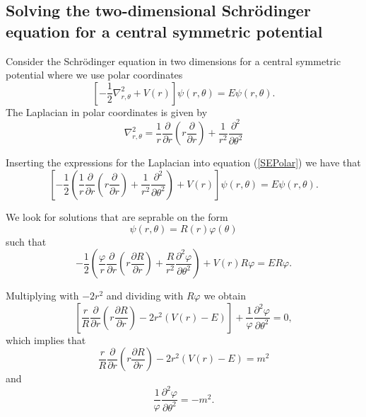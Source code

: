 \documentclass[aip,jcp,reprint,floatfix]{revtex4-1}
\begin{document}
\begin{appendices}
\section{Solving the two-dimensional Schrödinger equation for a central symmetric potential}
Consider the Schrödinger equation in two dimensions for a central symmetric potential where we use polar coordinates 
\begin{equation}
    \left[ - \frac{1}{2} \nabla^2_{r,\theta} + V(r) \right] \psi(r,\theta) = E\psi(r,\theta). \label{SEPolar}
\end{equation}
The Laplacian in polar coordinates is given by
\begin{equation}
    \nabla_{r,\theta}^2 = \frac{1}{r} \frac{\partial}{\partial r} \left( r \frac{\partial}{\partial r} \right) + \frac{1}{r^2} \frac{\partial^2}{\partial \theta^2}
\end{equation}

Inserting the expressions for the Laplacian into equation (\ref{SEPolar}) we have that
\begin{equation}
    \left[ - \frac{1}{2} \left(\frac{1}{r} \frac{\partial}{\partial r} \left( r \frac{\partial}{\partial r} \right) + \frac{1}{r^2} \frac{\partial^2}{\partial \theta^2} \right) + V(r) \right] \psi(r,\theta) = E\psi(r,\theta).
\end{equation}

We look for solutions that are seprable on the form
\begin{equation}
    \psi(r,\theta) = R(r) \varphi(\theta)
\end{equation}
such that
\begin{equation*}
     - \frac{1}{2} \left(\frac{\varphi}{r} \frac{\partial}{\partial r} \left( r \frac{\partial R}{\partial r} \right) + \frac{R}{r^2} \frac{\partial^2 \varphi}{\partial \theta^2} \right) + V(r)R\varphi   = ER\varphi.
\end{equation*}

Multiplying with $-2r^2$ and dividing with $R\varphi$ we obtain
\begin{equation*}
      \left[\frac{r}{R}\frac{\partial}{\partial r} \left( r \frac{\partial R}{\partial r} \right) -2r^2 (V(r)-E) \right] + \frac{1}{\varphi} \frac{\partial^2 \varphi}{\partial \theta^2}     = 0,
\end{equation*}
which implies that 
\begin{equation}
    \frac{r}{R}\frac{\partial}{\partial r} \left( r \frac{\partial R}{\partial r} \right) -2r^2 (V(r)-E) = m^2 \end{equation}
    and
    \begin{equation}
    \frac{1}{\varphi} \frac{\partial^2 \varphi}{\partial \theta^2} = -m^2.
\end{equation}


\end{appendices}
\end{document}

